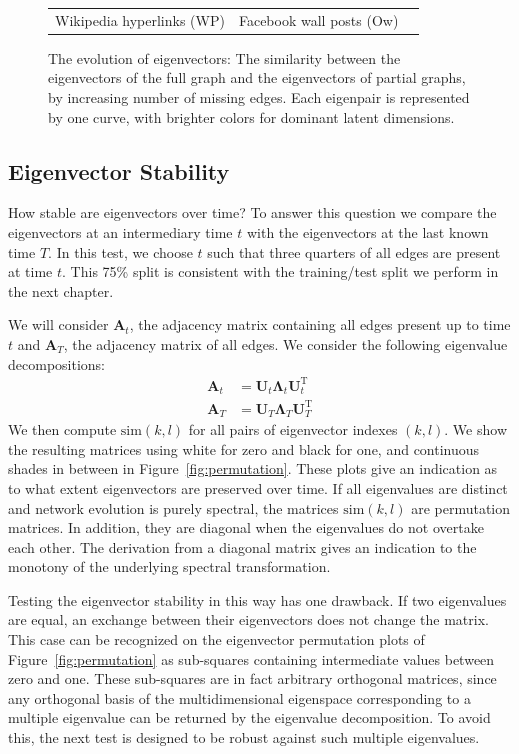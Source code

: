 \documentclass[11pt,a4paper]{book}
\newcommand{\totaltime}{T} %
\begin{document}
\begin{figure}[h!]
\begin{tabular}{ccc}
    Wikipedia hyperlinks (\textsf{WP}) &
    Facebook wall posts (\textsf{Ow}) 
  \end{tabular}
  \caption{
    The evolution of eigenvectors:  The similarity between the
    eigenvectors of the full graph and the eigenvectors of partial
    graphs, by increasing number of missing edges.  Each eigenpair
    is represented by one curve, with brighter colors for dominant latent
    dimensions. 
  }
  \label{fig:eigenvector-evolution}
\end{figure}

\subsection{Eigenvector Stability}
How stable are eigenvectors over time?  To answer this question we
compare the eigenvectors at an intermediary time $t$ with the
eigenvectors at the last known time $T$.  In this test, we 
choose $t$ such that three quarters of all edges are present at time
$t$.  This 75\% split is consistent with the training/test split we
perform in the next chapter.  

We will consider $\mathbf A_{t}$, the adjacency matrix containing all
edges present up to time $t$ and $\mathbf A_{\totaltime}$, the adjacency
matrix of all edges.  We consider the following eigenvalue
decompositions:
\begin{align*}
  \mathbf A_{t}^{\phantom {\mathrm I}}&=\mathbf U_{t}^{\phantom
    {\mathrm I}}\mathbf \Lambda_{t}^{\phantom {\mathrm I}}\mathbf
  U_{t}^{\mathrm T} \\ 
  \mathbf A_{\totaltime}^{\phantom {\mathrm I}}&=\mathbf U_{\totaltime}^{\phantom
    {\mathrm I}}\mathbf \Lambda_{\totaltime}^{\phantom {\mathrm I}}\mathbf
  U_{\totaltime}^{\mathrm T} 
\end{align*}
We then compute $\mathrm{sim}(k,l)$
for all pairs of eigenvector indexes $(k,l)$.  We show the resulting matrices
using white for zero and black for one, and continuous shades in
between in Figure~\ref{fig:permutation}. 
These plots give an indication as to what extent eigenvectors are
preserved over time. 
If all eigenvalues are distinct and network evolution is purely
spectral, the matrices $\mathrm{sim}(k,l)$ are permutation 
matrices.  In addition, they are diagonal when the eigenvalues do
not overtake each other.  
The derivation from a diagonal matrix gives an indication to the
monotony of the underlying spectral transformation. 

Testing the eigenvector stability in this way has one drawback. 
If two eigenvalues are equal, an exchange between
their eigenvectors does not change the matrix.  
This case can be recognized on the eigenvector permutation plots of
Figure~\ref{fig:permutation} as sub-squares containing intermediate
values between zero and one. 
These sub-squares are in fact arbitrary orthogonal matrices, since any
orthogonal basis of the multidimensional eigenspace corresponding to a
multiple eigenvalue can be returned by the eigenvalue decomposition. 
To avoid this, the next test is designed to be robust against such multiple
eigenvalues.   
\end{document}
